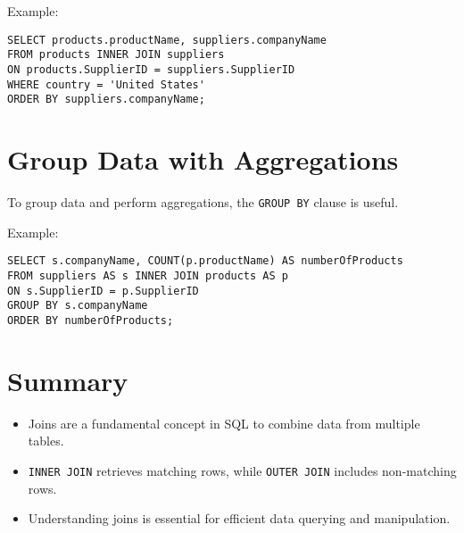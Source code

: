 \documentclass{article}
\begin{document}
Example:
\begin{verbatim}
SELECT products.productName, suppliers.companyName
FROM products INNER JOIN suppliers
ON products.SupplierID = suppliers.SupplierID
WHERE country = 'United States'
ORDER BY suppliers.companyName;
\end{verbatim}

\section{Group Data with Aggregations}
To group data and perform aggregations, the \texttt{GROUP BY} clause is useful.

Example:
\begin{verbatim}
SELECT s.companyName, COUNT(p.productName) AS numberOfProducts
FROM suppliers AS s INNER JOIN products AS p
ON s.SupplierID = p.SupplierID
GROUP BY s.companyName
ORDER BY numberOfProducts;
\end{verbatim}

\section{Summary}
\begin{itemize}
    \item Joins are a fundamental concept in SQL to combine data from multiple tables.
    \item \texttt{INNER JOIN} retrieves matching rows, while \texttt{OUTER JOIN} includes non-matching rows.
    \item Understanding joins is essential for efficient data querying and manipulation.
\end{itemize}
\end{document}

